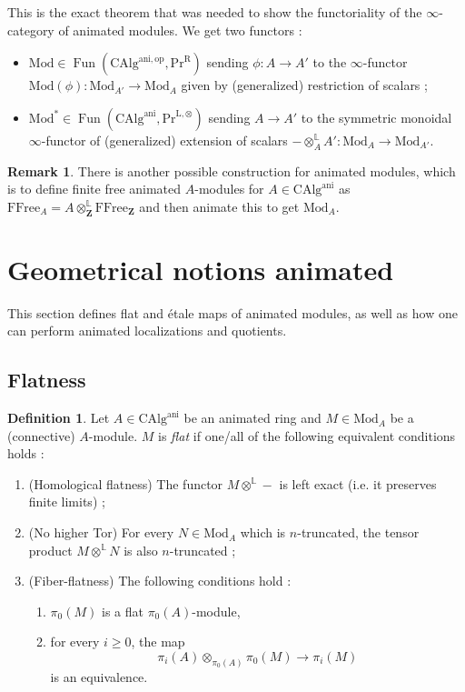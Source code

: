 \documentclass[11pt]{article}
\theoremstyle{definition}
\newtheorem{definition}[theorem]{Definition}
\newtheorem{remark}[theorem]{Remark}
\newcommand{\ani}{\mathrm{ani}}
\newcommand{\CAlg}{\mathrm{CAlg}}
\newcommand{\FFree}{\mathrm{FFree}}
\newcommand{\Fun}{\operatorname{Fun}}
\renewcommand{\L}{\mathbb{L}}
\newcommand{\Mod}{\mathrm{Mod}}
\newcommand{\op}{\mathrm{op}}
\newcommand{\PrR}{\mathrm{Pr}^{\mathrm{R}}}
\newcommand{\Z}{\mathbf{Z}}
\begin{document}
This is the exact theorem that was needed to show the functoriality of the $\infty$-category of animated modules.
We get two functors :
\begin{itemize}
    \item $\Mod \in \Fun(\CAlg^{\ani, \op}, \PrR)$ sending $\phi : A \to A'$ to the $\infty$-functor $\Mod(\phi) : \Mod_{A'} \to \Mod_A$ given by (generalized) restriction of scalars ;
    \item $\Mod^* \in \Fun(\CAlg^{\ani}, \mathrm{Pr}^{\mathrm{L}, \otimes})$ sending $A \to A'$ to the symmetric monoidal $\infty$-functor of (generalized) extension of scalars $- \otimes_A^{\L} A' : \Mod_A \to \Mod_{A'}$.
\end{itemize}

\begin{remark}
    There is another possible construction for animated modules, which is to define finite free animated $A$-modules for $A \in \CAlg^{\ani}$ as $\FFree_A = A \otimes_{\Z}^{\L} \FFree_{\Z}$
    and then animate this to get $\Mod_A$.
\end{remark}

\section{Geometrical notions animated}

This section defines flat and étale maps of animated modules, as well as how one can perform animated localizations and quotients.

\subsection{Flatness}

\begin{definition}
    Let $A \in \CAlg^{\ani}$ be an animated ring and $M \in \Mod_A$ be a (connective) $A$-module.
    $M$ is \emph{flat} if one/all of the following equivalent conditions holds :
    \begin{enumerate}
        \item (Homological flatness) The functor $M \otimes^{\L} -$ is left exact (i.e. it preserves finite limits) ;
        \item (No higher Tor) For every $N \in \Mod_A$ which is $n$-truncated, the tensor product $M \otimes^{\L} N$ is also $n$-truncated ;
        \item (Fiber-flatness) The following conditions hold :
        \begin{enumerate}
            \item $\pi_0(M)$ is a flat $\pi_0(A)$-module,
            \item for every $i \geq 0$, the map
            \[
                \pi_i(A) \otimes_{\pi_0(A)} \pi_0(M) \to \pi_i(M)
            \]
            is an equivalence.
        \end{enumerate}
    \end{enumerate}
\end{definition}
\end{document}

